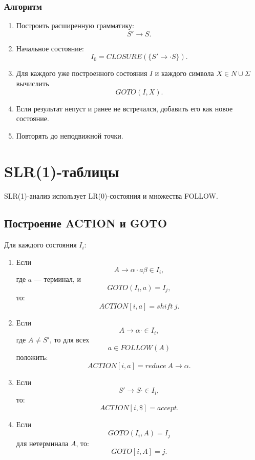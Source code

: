 \documentclass[12pt,a4paper]{article}
\begin{document}
\subsubsection*{Алгоритм}

\begin{enumerate}
    \item Построить расширенную грамматику:
    \[
    S' \to S.
    \]
    \item Начальное состояние:
    \[
    I_0 = CLOSURE(\{S'\to\cdot S\}).
    \]
    \item Для каждого уже построенного состояния $I$ и каждого символа $X \in N\cup\Sigma$ вычислить
    \[
    GOTO(I,X).
    \]
    \item Если результат непуст и ранее не встречался, добавить его как новое состояние.
    \item Повторять до неподвижной точки.
\end{enumerate}

\section{SLR(1)-таблицы}

SLR(1)-анализ использует LR(0)-состояния и множества FOLLOW.

\subsection{Построение ACTION и GOTO}

Для каждого состояния $I_i$:

\begin{enumerate}
    \item Если
    \[
    A \to \alpha \cdot a \beta \in I_i,
    \]
    где $a$ --- терминал, и
    \[
    GOTO(I_i,a)=I_j,
    \]
    то:
    \[
    ACTION[i,a]=shift\ j.
    \]

    \item Если
    \[
    A \to \alpha \cdot \in I_i,
    \]
    где $A \ne S'$, то для всех
    \[
    a \in FOLLOW(A)
    \]
    положить:
    \[
    ACTION[i,a]=reduce\ A\to\alpha.
    \]

    \item Если
    \[
    S'\to S\cdot \in I_i,
    \]
    то:
    \[
    ACTION[i,\$]=accept.
    \]

    \item Если
    \[
    GOTO(I_i,A)=I_j
    \]
    для нетерминала $A$, то:
    \[
    GOTO[i,A]=j.
    \]
\end{enumerate}
\end{document}
